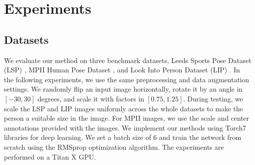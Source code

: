 \documentclass[10pt,twocolumn,letterpaper]{article}
\begin{document}
\section{Experiments}

\subsection{Datasets}

We evaluate our method on three benchmark datasets, Leeds Sports Pose Dataset (LSP) \cite{JohnsonE10}, MPII Human Pose Dataset \cite{AndrilukaPGS14}, and Look Into Person Dataset (LIP) \cite{GongLSL17}. In the following experiments, we use the same preprocessing and data augmentation settings. We randomly flip an input image horizontally, rotate it by an angle in $[-30,30]$ degrees, and scale it with factors in $[0.75,1.25]$. During testing, we scale the LSP and LIP images uniformly across the whole datasets to make the person a suitable size in the image. For MPII images, we use the scale and center annotations provided with the images. We implement our methods using Torch7 libraries for deep learning. We set a batch size of $6$ and train the network from scratch using the RMSprop optimization algorithm. The experiments are performed on a Titan X GPU. 
\end{document}
